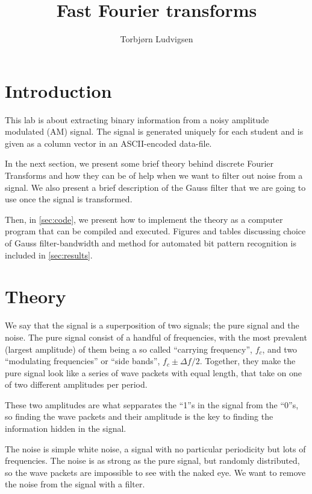 \documentclass[12pt,a4paper]{article}
\author{Torbjørn Ludvigsen}
\title{Fast Fourier transforms}
\begin{document}
\maketitle
%

\begin{abstract}
\end{abstract}

\vspace{2cm}
\tableofcontents
\clearpage

\section{Introduction}
This lab is about extracting binary information from a noisy amplitude modulated (AM) signal.
The signal is generated uniquely for each student and is given as a column vector
in an ASCII-encoded data-file. 

In the next section, we present some brief theory behind discrete Fourier Transforms
and how they can be of help when we want to filter out noise from a signal.
We also present a brief description of the Gauss filter that we are going to use
once the signal is transformed.

Then, in \ref{sec:code}, we present how to implement the theory as
a computer program that can be compiled and executed.
Figures and tables discussing choice of Gauss filter-bandwidth and method for automated
bit pattern recognition is included in \ref{sec:results}.

\section{Theory}
We say that the signal is a superposition of two signals; the pure signal and the noise.
The pure signal consist of a handful of frequencies, with
the most prevalent (largest amplitude) of them being a so called ``carrying frequency'',
$f_c$, and two ``modulating frequencies'' or ``side bands'', $f_c\pm\Delta f/2$.
Together, they make the pure signal look like
a series of wave packets with equal length, that take on one of two
different amplitudes per period.

These two amplitudes are what sepparates the ``1''s in the signal from the ``0''s,
so finding the wave packets and their amplitude is the key to finding the
information hidden in the signal.

The noise is simple white noise, a signal with no particular periodicity but lots of frequencies.
The noise is as strong as the pure signal, but randomly distributed, so the wave packets
are impossible to see with the naked eye. We want to remove the noise from the signal
with a filter.
\end{document}

